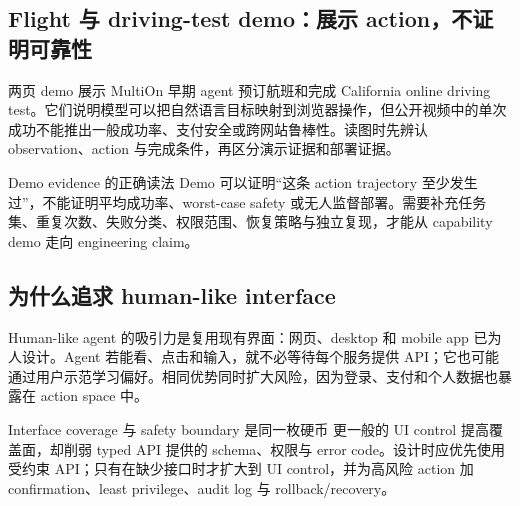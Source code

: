
\subsection{Flight 与 driving-test demo：展示 action，不证明可靠性}

两页 demo 展示 MultiOn 早期 agent 预订航班和完成 California online driving test。它们说明模型可以把自然语言目标映射到浏览器操作，但公开视频中的单次成功不能推出一般成功率、支付安全或跨网站鲁棒性。读图时先辨认 observation、action 与完成条件，再区分演示证据和部署证据。



\begin{warningbox}{Demo evidence 的正确读法}
Demo 可以证明“这条 action trajectory 至少发生过”，不能证明平均成功率、worst-case safety 或无人监督部署。需要补充任务集、重复次数、失败分类、权限范围、恢复策略与独立复现，才能从 capability demo 走向 engineering claim。
\end{warningbox}


\subsection{为什么追求 human-like interface}

Human-like agent 的吸引力是复用现有界面：网页、desktop 和 mobile app 已为人设计。Agent 若能看、点击和输入，就不必等待每个服务提供 API；它也可能通过用户示范学习偏好。相同优势同时扩大风险，因为登录、支付和个人数据也暴露在 action space 中。


\begin{importantbox}{Interface coverage 与 safety boundary 是同一枚硬币}
更一般的 UI control 提高覆盖面，却削弱 typed API 提供的 schema、权限与 error code。设计时应优先使用受约束 API；只有在缺少接口时才扩大到 UI control，并为高风险 action 加 confirmation、least privilege、audit log 与 rollback/recovery。
\end{importantbox}

